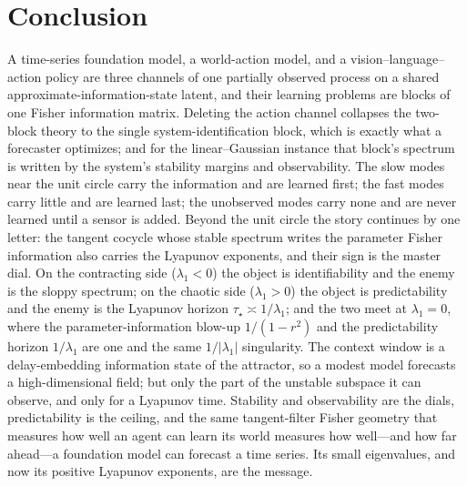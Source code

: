 \documentclass[10pt]{article}
\theoremstyle{plain}
\theoremstyle{definition}
\theoremstyle{remark}
\begin{document}
\section{Conclusion}
\label{sec:conclusion}
A time-series foundation model, a world-action model, and a
vision--language--action policy are three channels of one partially observed
process on a shared approximate-information-state latent, and their learning
problems are blocks of one Fisher information matrix. Deleting the action channel
collapses the two-block theory to the single system-identification block, which is
exactly what a forecaster optimizes; and for the linear--Gaussian instance that
block's spectrum is written by the system's stability margins and observability.
The slow modes near the unit circle carry the information and are learned first;
the fast modes carry little and are learned last; the unobserved modes carry none
and are never learned until a sensor is added. Beyond the unit circle the story
continues by one letter: the tangent cocycle whose stable spectrum writes the
parameter Fisher information also carries the Lyapunov exponents, and their sign is
the master dial. On the contracting side ($\lambda_1<0$) the object is
identifiability and the enemy is the sloppy spectrum; on the chaotic side
($\lambda_1>0$) the object is predictability and the enemy is the Lyapunov horizon
$\tau_\star\asymp1/\lambda_1$; and the two meet at $\lambda_1=0$, where the
parameter-information blow-up $1/(1-r^2)$ and the predictability horizon
$1/\lambda_1$ are one and the same $1/|\lambda_1|$ singularity. The context window
is a delay-embedding information state of the attractor, so a modest model
forecasts a high-dimensional field; but only the part of the unstable subspace it
can observe, and only for a Lyapunov time. Stability and observability are the
dials, predictability is the ceiling, and the same tangent-filter Fisher geometry
that measures how well an agent can learn its world measures how well---and how
far ahead---a foundation model can forecast a time series. Its small eigenvalues,
and now its positive Lyapunov exponents, are the message.
\end{document}

